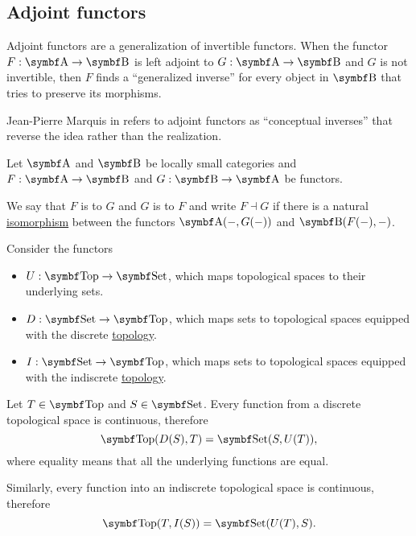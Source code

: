 \subsection{Adjoint functors}\label{subsec:adjoint_functors}

\begin{remark}\label{def:adjoint_functors}
  Adjoint functors are a generalization of invertible functors. When the functor \( F: \Cat{A} \to \Bold B \) is left adjoint to \( G: \Cat{A} \to \Bold B \) and \( G \) is not invertible, then \( F \) finds a \enquote{generalized inverse} for every object in \( \Bold B \) that tries to preserve its morphisms.

  Jean-Pierre Marquis in \cite{StanfordPlato:category_theory} refers to adjoint functors as \enquote{conceptual inverses} that reverse the idea rather than the realization.
\end{remark}

\begin{definition}\label{def:adjoint_functor}
  Let \( \Cat{A} \) and \( \Bold B \) be locally small categories and \( F: \Cat{A} \to \Bold B \) and \( G: \Bold B \to \Cat{A} \) be functors.

  We say that \( F \) is  to \( G \) and \( G \) is  to \( F \) and write \( F \dashv G \) if there is a natural \hyperref[def:natural_isomorpism]{isomorphism} between the functors \( \Cat{A}(-, G(-)) \) and \( \Cat{B}(F(-), -) \).
\end{definition}

\begin{example}\label{ex:top_adjoint_functor}
  Consider the functors
  \begin{itemize}
    \item \( U: \Cat{Top} \to \Cat{Set} \), which maps topological spaces to their underlying sets.
    \item \( D: \Cat{Set} \to \Cat{Top} \), which maps sets to topological spaces equipped with the discrete \hyperref[def:standard_topologies/discrete]{topology}.
    \item \( I: \Cat{Set} \to \Cat{Top} \), which maps sets to topological spaces equipped with the indiscrete \hyperref[def:standard_topologies/indiscrete]{topology}.
  \end{itemize}

  Let \( T \in \Cat{Top} \) and \( S \in \Cat{Set} \). Every function from a discrete topological space is continuous, therefore
  \begin{equation*}
    \Cat{Top}(D(S), T) = \Cat{Set}(S, U(T)),
  \end{equation*}
  where equality means that all the underlying functions are equal.

  Similarly, every function into an indiscrete topological space is continuous, therefore
  \begin{equation*}
    \Cat{Top}(T, I(S)) = \Cat{Set}(U(T), S).
  \end{equation*}
\end{example}
